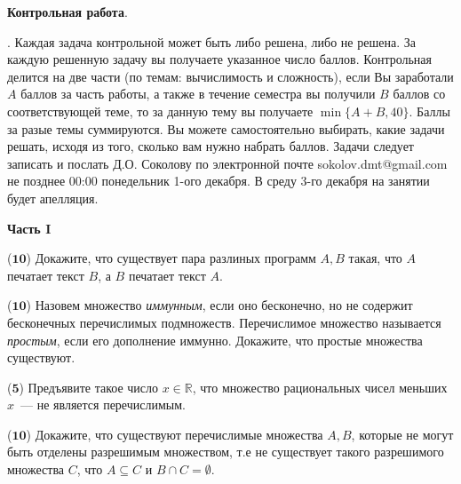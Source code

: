 \setcounter{curtask}{1}

\begin{center}
	{\bf Контрольная работа}.
\end{center}


.
Каждая задача контрольной может быть либо решена, либо не решена. За каждую решенную задачу вы получаете указанное число
баллов. Контрольная делится на две части (по темам: вычислимость и сложность), если Вы заработали $A$ баллов за часть работы, а
также в течение семестра вы получили $B$ баллов со соответствующей теме, то за данную тему вы получаете $\min \{A + B,
40\}$. Баллы за разые темы суммируются. Вы можете самостоятельно выбирать, какие задачи решать, исходя из того, сколько вам нужно
набрать баллов. Задачи следует записать и послать Д.О. Соколову по электронной почте sokolov.dmt@gmail.com не позднее 00:00
понедельник 1-ого декабря. В среду 3-го декабря на занятии будет апелляция.

\breakline


\setcounter{curtask}{1}

\begin{center}
    \textbf{Часть I}
\end{center}

\begin{task}($\mathbf{10}$)
    Докажите, что существует пара разлиных программ $A, B$ такая, что $A$ печатает текст $B$, а $B$ печатает текст $A$.
\end{task}

\begin{task}($\mathbf{10}$)
    Назовем множество {\it иммунным}, если оно бесконечно, но не содержит бесконечных перечислимых подмножеств. Перечислимое
множество называется {\it простым}, если его дополнение иммунно.  Докажите, что простые множества существуют.
\end{task}

\begin{task}($\mathbf{5}$)
    Предъявите такое число $x \in \mathbb{R}$, что множество рациональных чисел меньших $x$~--- не является перечислимым.
\end{task}

\begin{task}($\mathbf{10}$)
    Докажите, что существуют перечислимые множества $A, B$, которые не могут быть отделены разрешимым множеством, т.е не
	существует такого разрешимого множества $C$, что $A \subseteq C$ и $B \cap C = \emptyset$.
\end{task}

